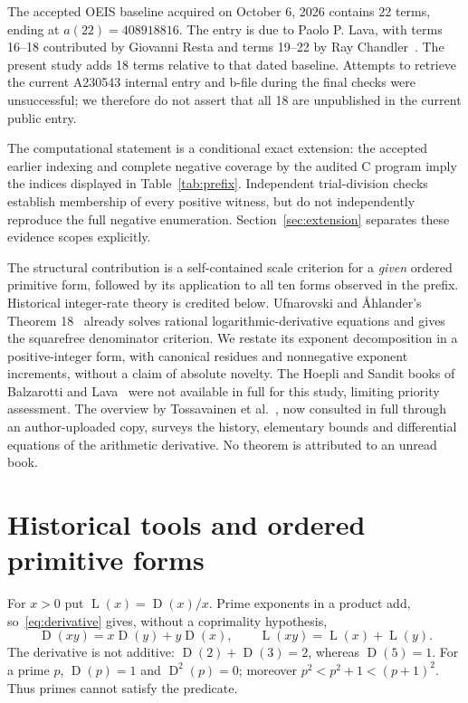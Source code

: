\documentclass[11pt]{article}
\newcommand{\D}{\operatorname{D}}
\newcommand{\Lrate}{\operatorname{L}}
\theoremstyle{definition}
\begin{document}
The accepted OEIS baseline acquired on October 6, 2026 contains 22 terms,
ending at $a(22)=408918816$. The entry is due to Paolo P. Lava, with
terms 16--18 contributed by Giovanni Resta and terms 19--22 by Ray
Chandler~\cite{sequence}. The present study adds 18 terms relative to that
dated baseline. Attempts to retrieve the current A230543 internal entry
and b-file during the final checks were unsuccessful; we therefore do not
assert that all 18 are unpublished in the current public entry.

The computational statement is a conditional exact extension: the
accepted earlier indexing and complete negative coverage by the audited C
program imply the indices displayed in Table~\ref{tab:prefix}.
Independent trial-division checks establish membership of every positive
witness, but do not independently reproduce the full negative enumeration.
Section~\ref{sec:extension} separates these evidence scopes explicitly.

The structural contribution is a self-contained scale criterion for a
\emph{given} ordered primitive form, followed by its application to all
ten forms observed in the prefix. Historical integer-rate theory is
credited below. Ufnarovski and \AA hlander's Theorem 18~\cite{ufnarovski} already
solves rational logarithmic-derivative equations and gives the squarefree
denominator criterion. We restate its exponent decomposition in a
positive-integer form, with canonical residues and nonnegative exponent
increments, without a claim of absolute novelty. The
Hoepli and Sandit books of Balzarotti and Lava~\cite{book,sandit} were
not available in full for this study, limiting priority assessment.
The overview by Tossavainen et al.~\cite{overview}, now consulted in
full through an author-uploaded copy, surveys the history, elementary
bounds and differential equations of the arithmetic derivative.
No theorem is attributed to an unread book.

\section{Historical tools and ordered primitive forms}\label{sec:tools}
For $x>0$ put $\Lrate(x)=\D(x)/x$. Prime exponents in a product add,
so~\eqref{eq:derivative} gives, without a coprimality hypothesis,
\begin{equation}\label{eq:product}
 \D(xy)=x\D(y)+y\D(x),\qquad
 \Lrate(xy)=\Lrate(x)+\Lrate(y).
\end{equation}
The derivative is not additive: $\D(2)+\D(3)=2$, whereas $\D(5)=1$.
For a prime $p$, $\D(p)=1$ and $\D^2(p)=0$; moreover
$p^2<p^2+1<(p+1)^2$. Thus primes cannot satisfy the predicate.
\end{document}
